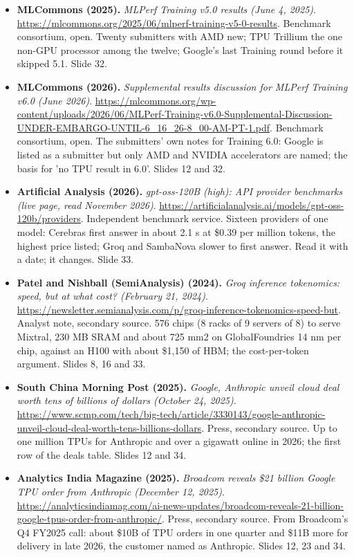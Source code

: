 \begin{itemize}[leftmargin=1.2em,itemsep=3pt]
\item \textbf{MLCommons (2025).} \textit{MLPerf Training v5.0 results (June 4, 2025)}. \url{https://mlcommons.org/2025/06/mlperf-training-v5-0-results}. Benchmark consortium, open. Twenty submitters with AMD new; TPU Trillium the one non-GPU processor among the twelve; Google's last Training round before it skipped 5.1. Slide 32.
\item \textbf{MLCommons (2026).} \textit{Supplemental results discussion for MLPerf Training v6.0 (June 2026)}. \url{https://mlcommons.org/wp-content/uploads/2026/06/MLPerf-Training-v6.0-Supplemental-Discussion-UNDER-EMBARGO-UNTIL-6_16_26-8_00-AM-PT-1.pdf}. Benchmark consortium, open. The submitters' own notes for Training 6.0: Google is listed as a submitter but only AMD and NVIDIA accelerators are named; the basis for 'no TPU result in 6.0'. Slides 12 and 32.
\item \textbf{Artificial Analysis (2026).} \textit{gpt-oss-120B (high): API provider benchmarks (live page, read November 2026)}. \url{https://artificialanalysis.ai/models/gpt-oss-120b/providers}. Independent benchmark service. Sixteen providers of one model: Cerebras first answer in about 2.1 s at \$0.39 per million tokens, the highest price listed; Groq and SambaNova slower to first answer. Read it with a date; it changes. Slide 33.
\item \textbf{Patel and Nishball (SemiAnalysis) (2024).} \textit{Groq inference tokenomics: speed, but at what cost? (February 21, 2024)}. \url{https://newsletter.semianalysis.com/p/groq-inference-tokenomics-speed-but}. Analyst note, secondary source. 576 chips (8 racks of 9 servers of 8) to serve Mixtral, 230 MB SRAM and about 725 mm2 on GlobalFoundries 14 nm per chip, against an H100 with about \$1,150 of HBM; the cost-per-token argument. Slides 8, 16 and 33.
\item \textbf{South China Morning Post (2025).} \textit{Google, Anthropic unveil cloud deal worth tens of billions of dollars (October 24, 2025)}. \url{https://www.scmp.com/tech/big-tech/article/3330143/google-anthropic-unveil-cloud-deal-worth-tens-billions-dollars}. Press, secondary source. Up to one million TPUs for Anthropic and over a gigawatt online in 2026; the first row of the deals table. Slides 12 and 34.
\item \textbf{Analytics India Magazine (2025).} \textit{Broadcom reveals \$21 billion Google TPU order from Anthropic (December 12, 2025)}. \url{https://analyticsindiamag.com/ai-news-updates/broadcom-reveals-21-billion-google-tpus-order-from-anthropic/}. Press, secondary source. From Broadcom's Q4 FY2025 call: about \$10B of TPU orders in one quarter and \$11B more for delivery in late 2026, the customer named as Anthropic. Slides 12, 23 and 34.

\end{itemize}
